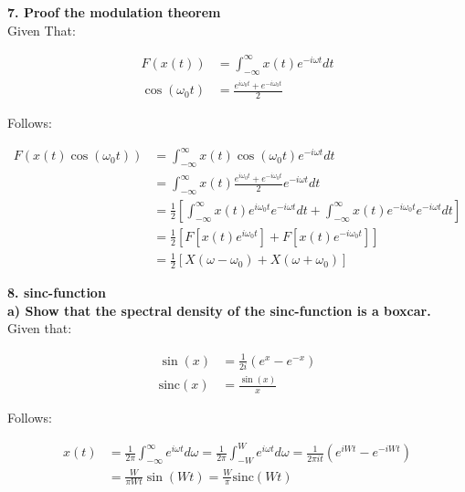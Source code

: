 \newpage

\textbf{\large 7. Proof the modulation theorem}
\\

Given That:

\begin{align}
	F(x(t)) &= \int_{-\infty}^\infty x(t) e^{-i \omega t} dt \\
	\cos(\omega_0 t) &= \frac{e^{i \omega_0 t} + e^{-i \omega_0 t}}{2}
\end{align}

Follows:

\begin{align*}
	F(x(t) \cos(\omega_0 t)) &= \int_{-\infty}^\infty x(t) \cos(\omega_0 t) e^{-i \omega t} dt \\
	&= \int_{-\infty}^\infty x(t) \frac{e^{i \omega_0 t} + e^{-i \omega_0 t}}{2} e^{-i \omega t} dt \\
	&= \frac{1}{2} \left[ \int_{-\infty}^\infty x(t) e^{i \omega_0 t} e^{-i \omega t} dt + \int_{-\infty}^\infty x(t) e^{-i \omega_0 t} e^{-i \omega t} dt \right] \\
	&= \frac{1}{2} \left[ F\left[x(t) e^{i \omega_0 t} \right] + F\left[x(t) e^{-i \omega_0 t} \right] \right] \\
	&= \frac{1}{2} \left[ X(\omega - \omega_0) + X(\omega + \omega_0) \right]
\end{align*}



\textbf{\large 8. sinc-function}
\\

\textbf{
	a) Show that the spectral density of the sinc-function is a boxcar. 
} 
\\

Given that:

\begin{align}
	\sin(x) &= \frac{1}{2i} \left( e^x - e^{-x} \right) \\
	\text{sinc}(x) &= \frac{\sin(x)}{x}
\end{align}

Follows:

\begin{align*}
	x(t) &= \frac{1}{2 \pi} \int_{-\infty}^{\infty} e^{i \omega t} d \omega 
	= \frac{1}{2 \pi} \int_{-W}^{W} e^{i \omega t} d \omega 
	= \frac{1}{2 \pi i t} \left( e^{i W t} - e^{-i W t} \right) \\
	&= \frac{W}{\pi W t} \sin(W t) 
	= \frac{W}{\pi} \text{sinc}(W t) \\ 
\end{align*}


